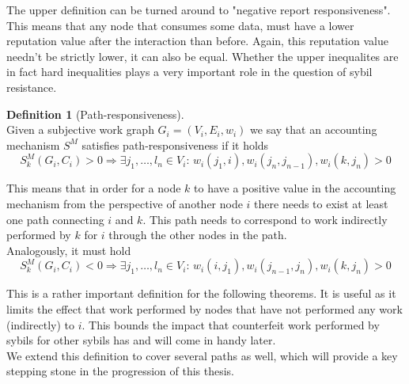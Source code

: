 \documentclass[11pt,a4paper]{article}
\theoremstyle{definition}
\newtheorem{definition}{Definition}[section]
\theoremstyle{theorem}
\theoremstyle{proposition}
\theoremstyle{corollary}
\theoremstyle{lemma}
\theoremstyle{example}
\theoremstyle{remark}
\begin{document}
\noindent{}The upper definition can be turned around to "negative report responsiveness". This means that any node that consumes some data, must have a lower reputation value after the interaction than before. Again, this reputation value needn't be strictly lower, it can also be equal. Whether the upper inequalites are in fact hard inequalities plays a very important role in the question of sybil resistance.\vspace{1em}\\ 

\begin{definition}[Path-responsiveness]\ \\
Given a subjective work graph $G_i=(V_i,E_i,w_i)$ we say that an accounting mechanism $S^M$ satisfies path-responsiveness if it holds
\[
S^M_k(G_i,C_i)>0\Rightarrow\exists{}j_1,\ldots,l_n\in{}V_i:\,w_i(j_1,i),w_i(j_n,j_{n-1}),w_i(k,j_n)>0
\]
\end{definition}
\noindent{}This means that in order for a node $k$ to have a positive value in the accounting mechanism from the perspective of another node $i$ there needs to exist at least one path connecting $i$ and $k$. This path needs to correspond to work indirectly performed by $k$ for $i$ through the other nodes in the path. \vspace{1em}\\

\noindent{}Analogously, it must hold
\[
S^M_k(G_i,C_i)<0\Rightarrow\exists{}j_1,\ldots,l_n\in{}V_i:\,w_i(i,j_1),w_i(j_{n-1},j_n),w_i(k,j_n)>0
\]

\noindent{}This is a rather important definition for the following theorems. It is useful as it limits the effect that work performed by nodes that have not performed any work (indirectly) to $i$. This bounds the impact that counterfeit work performed by sybils for other sybils has and will come in handy later. \vspace{1em}\\

\noindent{}We extend this definition to cover several paths as well, which will provide a key stepping stone in the progression of this thesis. 
\end{document}
